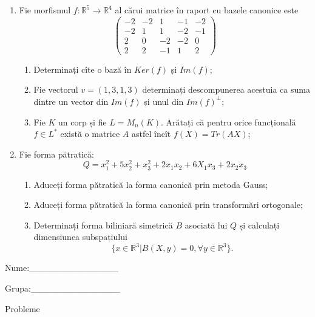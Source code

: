 \documentclass{article}
\begin{document}
\begin{enumerate}
 \item Fie morfismul $f:\mathbb{R}^5 \to \mathbb{R}^4$ al cărui matrice în raport cu bazele canonice este
$$\begin{pmatrix}
-2&-2&1&-1&-2\\
-2&1&1&-2&-1\\
2&0&-2&-2&0\\
2&2&-1&1&2
\end{pmatrix}$$

\begin{enumerate}
\item Determinați cîte o bază în $Ker(f)$ și $Im(f)$;
\item Fie vectorul $v=(1,3,1,3)$ determinați descompunerea acestuia ca suma dintre un vector din $Im(f)$ și unul din $Im(f)^\perp$;
\item Fie $K$ un corp și fie $L=M_n(K)$. Arătați că pentru orice funcțională $f \in L^*$ există o matrice $A$ astfel încît $f(X)=Tr(AX)$;
\end{enumerate}
\item Fie forma pătratică:
$$Q= x_1^2+5x_2^2+x_3^2+2x_1x_2+6X_1x_3+2x_2x_3$$

\begin{enumerate}
\item Aduceți forma pătratică la forma canonică prin metoda Gauss;
\item Aduceți forma pătratică la forma canonică prin transformări ortogonale;
\item Determinați forma biliniară simetrică $B$ asociată lui $Q$ și calculați dimensiunea subspațiului
$$\{x \in \mathbb{R}^3 | B(X,y)=0,\forall y \in \mathbb{R}^3\}.$$

\end{enumerate}
\end{enumerate}
\newpage
\begin{flushright}
Nume:\_\_\_\_\_\_\_\_\_\_\_\_\_\_
 
 
Grupa:\_\_\_\_\_\_\_\_\_\_\_\_\_\_
\end{flushright}
\begin{center}
\vspace{2cm}
{\Large Probleme}
\vspace{2cm}
\end{center}
\end{document}
